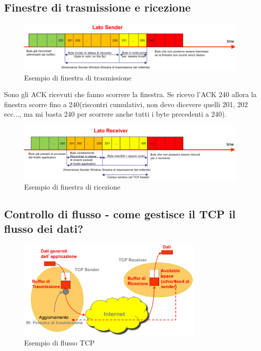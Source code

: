 \subsection{Finestre di trasmissione e ricezione}
\begin{figure}[h!]
    \centering
    \includegraphics[width=1\textwidth]{images/finestratrasmissione.png}
    \caption{Esempio di finestra di trasmissione}
    \label{fig:finestratrasmissione}
\end{figure}

Sono gli ACK ricevuti che fanno scorrere la finestra. Se ricevo l'ACK 240 allora la finestra scorre fino a 240(riscontri cumulativi, non devo dicevere quelli 201, 202 ecc..., ma mi basta 240 per scorrere anche tutti i byte precedenti a 240).




\begin{figure}[h!]
    \centering
    \includegraphics[width=1\textwidth]{images/finestraricezione.png}
    \caption{Esempio di finestra di ricezione}
    \label{fig:finestraricezione}
\end{figure}



\subsection{Controllo di flusso - come gestisce il TCP il flusso dei dati?}

\begin{figure}[h!]
    \centering
    \includegraphics[width=0.8\textwidth]{images/tcpflusso.png}
    \caption{Esempio di flusso TCP}
    \label{fig:tcpflusso}
\end{figure}


